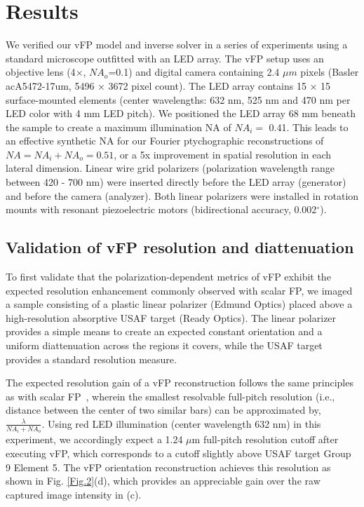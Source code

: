 \documentclass{article}
\begin{document}
\section{Results}
We verified our vFP model and inverse solver in a series of experiments using a standard microscope outfitted with an LED array. The vFP setup uses an objective lens (4$\times$, $NA_o$=0.1) and digital camera containing 2.4 $\mu m$ pixels (Basler acA5472-17um, 5496 × 3672 pixel count). The LED array contains 15 × 15 surface-mounted elements (center wavelengths: 632 nm, 525 nm and 470 nm per LED color with 4 mm LED pitch). We positioned the LED array 68 mm beneath the sample to create a maximum illumination NA of $NA_i=$ 0.41. This leads to an effective synthetic NA for our Fourier ptychographic reconstructions of $NA=NA_i+NA_o=0.51$, or a 5x improvement in spatial resolution in each lateral dimension. Linear wire grid polarizers (polarization wavelength range between 420 - 700 nm) were inserted directly before the LED array (generator) and before the camera (analyzer). Both linear polarizers were installed in rotation mounts with resonant piezoelectric motors (bidirectional accuracy, 0.002$^{\circ}$).

\subsection{Validation of vFP resolution and diattenuation}
To first validate that the polarization-dependent metrics of vFP exhibit the expected resolution enhancement commonly observed with scalar FP, we imaged a sample consisting of a plastic linear polarizer (Edmund Optics) placed above a high-resolution absorptive USAF target (Ready Optics). The linear polarizer provides a simple means to create an expected constant orientation and a uniform diattenuation across the regions it covers, while the USAF target provides a standard resolution measure.

The expected resolution gain of a vFP reconstruction follows the same principles as with scalar FP~\cite{Ou:15}, wherein the smallest resolvable full-pitch resolution (i.e., distance between the center of two similar bars) can be approximated by, $\frac{\lambda}{NA_{i}+NA_{o}}$. Using red LED illumination (center wavelength 632 nm) in this experiment, we accordingly expect a 1.24 $\mu$m full-pitch resolution cutoff after executing vFP, which corresponds to a cutoff slightly above USAF target Group 9 Element 5. The vFP orientation reconstruction achieves this resolution as shown in Fig. \ref{Fig.2}(d), which provides an appreciable gain over the raw captured image intensity in (c).
\end{document}
